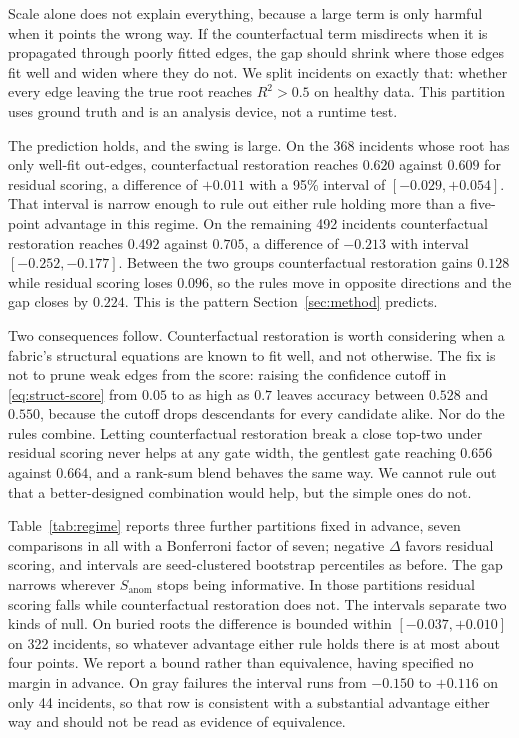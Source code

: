 \documentclass[conference]{IEEEtran}
\begin{document}
Scale alone does not explain everything, because a large term is only harmful when it points the wrong way. If the counterfactual term misdirects when it is propagated through poorly fitted edges, the gap should shrink where those edges fit well and widen where they do not. We split incidents on exactly that: whether every edge leaving the true root reaches $R^2>0.5$ on healthy data. This partition uses ground truth and is an analysis device, not a runtime test.

The prediction holds, and the swing is large. On the 368 incidents whose root has only well-fit out-edges, counterfactual restoration reaches $0.620$ against $0.609$ for residual scoring, a difference of $+0.011$ with a 95\% interval of $[-0.029,+0.054]$. That interval is narrow enough to rule out either rule holding more than a five-point advantage in this regime. On the remaining 492 incidents counterfactual restoration reaches $0.492$ against $0.705$, a difference of $-0.213$ with interval $[-0.252,-0.177]$. Between the two groups counterfactual restoration gains $0.128$ while residual scoring loses $0.096$, so the rules move in opposite directions and the gap closes by $0.224$. This is the pattern Section~\ref{sec:method} predicts.

Two consequences follow. Counterfactual restoration is worth considering when a fabric's structural equations are known to fit well, and not otherwise. The fix is not to prune weak edges from the score: raising the confidence cutoff in \eqref{eq:struct-score} from $0.05$ to as high as $0.7$ leaves accuracy between $0.528$ and $0.550$, because the cutoff drops descendants for every candidate alike. Nor do the rules combine. Letting counterfactual restoration break a close top-two under residual scoring never helps at any gate width, the gentlest gate reaching $0.656$ against $0.664$, and a rank-sum blend behaves the same way. We cannot rule out that a better-designed combination would help, but the simple ones do not.

Table~\ref{tab:regime} reports three further partitions fixed in advance, seven comparisons in all with a Bonferroni factor of seven; negative $\Delta$ favors residual scoring, and intervals are seed-clustered bootstrap percentiles as before. The gap narrows wherever $S_{\mathrm{anom}}$ stops being informative. In those partitions residual scoring falls while counterfactual restoration does not. The intervals separate two kinds of null. On buried roots the difference is bounded within $[-0.037,+0.010]$ on 322 incidents, so whatever advantage either rule holds there is at most about four points. We report a bound rather than equivalence, having specified no margin in advance. On gray failures the interval runs from $-0.150$ to $+0.116$ on only 44 incidents, so that row is consistent with a substantial advantage either way and should not be read as evidence of equivalence.
\end{document}

